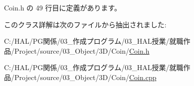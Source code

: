  Coin.\+h の 49 行目に定義があります。



このクラス詳解は次のファイルから抽出されました\+:\begin{DoxyCompactItemize}
\item 
C\+:/\+H\+A\+L/\+P\+G関係/03\+\_\+作成プログラム/03\+\_\+\+H\+A\+L授業/就職作品/\+Project/source/03\+\_\+\+Object/3\+D/\+Coin/\mbox{\hyperlink{_coin_8h}{Coin.\+h}}\item 
C\+:/\+H\+A\+L/\+P\+G関係/03\+\_\+作成プログラム/03\+\_\+\+H\+A\+L授業/就職作品/\+Project/source/03\+\_\+\+Object/3\+D/\+Coin/\mbox{\hyperlink{_coin_8cpp}{Coin.\+cpp}}\end{DoxyCompactItemize}
